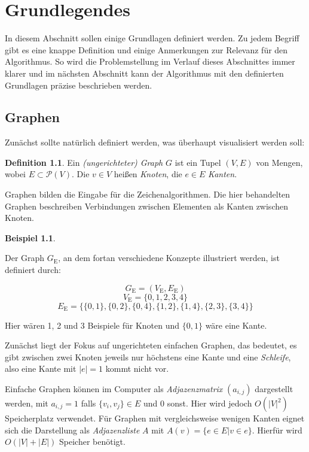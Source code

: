 \documentclass[a4paper]{scrreprt}
\theoremstyle{definition}
\newtheorem{definition}[satz]{Definition}
\newtheorem{example}[satz]{Beispiel}
\begin{document}
\chapter{Grundlegendes}
\label{chap:basics}

In diesem Abschnitt sollen einige Grundlagen definiert werden. Zu jedem Begriff gibt es eine knappe Definition und einige Anmerkungen zur Relevanz für den Algorithmus. So wird die Problemstellung im Verlauf dieses Abschnittes immer klarer und im nächsten Abschnitt kann der Algorithmus mit den definierten Grundlagen präzise beschrieben werden.

\section{Graphen}

Zunächst sollte natürlich definiert werden, was überhaupt visualisiert werden soll:

\begin{definition}
  Ein \emph{(ungerichteter) Graph} $G$ ist ein Tupel $(V, E)$ von Mengen, wobei $E \subset \mathcal{P}(V)$.
  Die $v \in V$ heißen \emph{Knoten}, die $e \in E$ \emph{Kanten}.
\end{definition}

Graphen bilden die Eingabe für die Zeichenalgorithmen. Die hier behandelten Graphen beschreiben Verbindungen zwischen Elementen als Kanten zwischen Knoten. 

\begin{example}
  \label{ex:graph}

Der Graph $G_\text{E}$, an dem fortan verschiedene Konzepte illustriert werden, ist definiert durch:

\[G_\text{E} = (V_\text{E}, E_\text{E})\]
\[V_\text{E} = \{0, 1, 2, 3, 4\}\]
\[E_\text{E} = \{\{0, 1\}, \{0, 2\}, \{0, 4\}, \{1, 2\}, \{1, 4\}, \{2, 3\}, \{3, 4\}\}\]

Hier wären 1, 2 und 3 Beispiele für Knoten und $\{0, 1\}$ wäre eine Kante.
\end{example}

Zunächst liegt der Fokus auf ungerichteten einfachen Graphen, das bedeutet, es gibt zwischen zwei Knoten jeweils nur höchstens eine Kante und eine \emph{Schleife}, also eine Kante mit $|e| = 1$ kommt nicht vor.

Einfache Graphen können im Computer als \emph{Adjazenzmatrix} $(a_{i,j})$ dargestellt werden, mit $a_{i,j} = 1$ falls $\{v_i, v_j\} \in E$ und $0$ sonst. Hier wird jedoch $O(|V|^2)$ Speicherplatz verwendet. Für Graphen mit vergleichsweise wenigen Kanten eignet sich die Darstellung als \emph{Adjazenzliste} $A$ mit $A(v) = \{e \in E | v \in e\}$. Hierfür wird $O(|V| + |E|)$ Speicher benötigt. %
\end{document}
